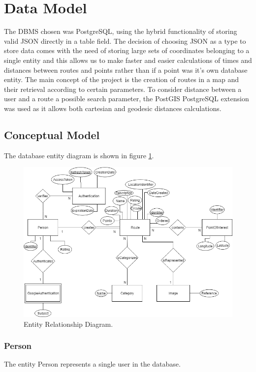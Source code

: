 \section{Data Model}
The DBMS chosen was PostgreSQL\cite{postgresql}, using the hybrid functionality 
of storing valid JSON\cite{postgresqljson} directly in a table field. The decision of choosing JSON as a type to 
store data comes with the need of storing large sets of coordinates belonging to a single entity and this 
allows us to make faster and easier calculations of times and distances between routes and points rather than if a 
point was it's own database entity. 
The main concept of the project is the creation of routes in a map and their retrieval according to certain parameters.
To consider distance between a user and a route a possible search parameter, the PostGIS\cite{postgis} 
PostgreSQL extension was used as it allows both cartesian and geodesic distances calculations.

    \subsection{Conceptual Model}
    The database entity diagram is shown in figure \ref{fig:erdiagram}.

    \begin{figure}[ht]            
        \includegraphics[width=\textwidth]{images/project-structure/dbms-structure.PNG}
        \caption{Entity Relationship Diagram.}
        \label{fig:erdiagram}
    \end{figure}   

        \subsubsection*{Person}
        The entity Person represents a single user in the database. 

